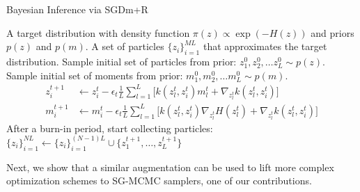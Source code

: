 \begin{algorithm}[ht] %
\caption{Bayesian Inference via SGDm+R}  
\label{alg:alg2}
\begin{algorithmic}[1]
 A target distribution with density function $\pi({z}) \propto \exp (-H({z}))$ and priors $p({z})$ and $p({m})$.
 A set of particles $\{{z}_i\}_{i=1}^{ML}$ that approximates the target distribution.  
\State Sample initial set of particles from prior: ${z}_1^0, {z}_2^0, \ldots {z}_L^0 \sim p({z})$.
\State Sample initial set of moments from prior: ${m}_1^0, {m}_2^0, \ldots {m}_L^0 \sim p({m})$.
\State 
\begin{align*} 
{z}_i^{t+1}  &\gets  {z}_i^t - \epsilon_t \frac{1}{L}\sum_{l=1}^L\big[  k({z}_l^t, {z}_i^t)  {m}_l^t + \nabla_{{z}_l^t} k({z}_l^t, {z}_i^t)\big] \\
{m}_i^{t+1}  &\gets  {m}_i^t - \epsilon_t \frac{1}{L}\sum_{l=1}^L\big[  k({z}_l^t, {z}_i^t)  \nabla_{{z}_l^t} H({z}_l^t) + \nabla_{{z}_l^t} k({z}_l^t, {z}_i^t)\big] %
\end{align*}
\State After a burn-in period, start collecting particles: $ \{{z}_i\}_{i=1}^{NL} \gets \{{z}_i\}_{i=1}^{(N-1)L} \cup \{ {z}_1^{t+1}, \ldots,  {z}_L^{t+1} \} $ 
\EndFor
\end{algorithmic}
\end{algorithm}
\noindent Next, we show that a similar augmentation can be used to lift more complex optimization schemes to SG-MCMC samplers, one of our contributions.


